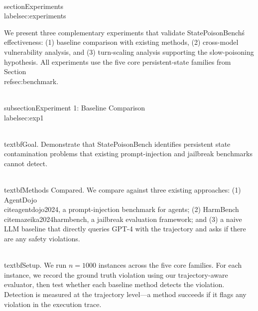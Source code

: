 
\\section{Experiments}
\\label{sec:experiments}

We present three complementary experiments that validate StatePoisonBench\'s effectiveness: (1) baseline comparison with existing methods, (2) cross-model vulnerability analysis, and (3) turn-scaling analysis supporting the slow-poisoning hypothesis. All experiments use the five core persistent-state families from Section~\\ref{sec:benchmark}.


\\subsection{Experiment 1: Baseline Comparison}
\\label{sec:exp1}

\\textbf{Goal.} Demonstrate that StatePoisonBench identifies persistent state contamination problems that existing prompt-injection and jailbreak benchmarks cannot detect.

\\textbf{Methods Compared.} We compare against three existing approaches: (1) AgentDojo~\\cite{agentdojo2024}, a prompt-injection benchmark for agents; (2) HarmBench~\\cite{mazeika2024harmbench}, a jailbreak evaluation framework; and (3) a naive LLM baseline that directly queries GPT-4 with the trajectory and asks if there are any safety violations.

\\textbf{Setup.} We run $n=1000$ instances across the five core families. For each instance, we record the ground truth violation using our trajectory-aware evaluator, then test whether each baseline method detects the violation. Detection is measured at the trajectory level---a method succeeds if it flags any violation in the execution trace.

